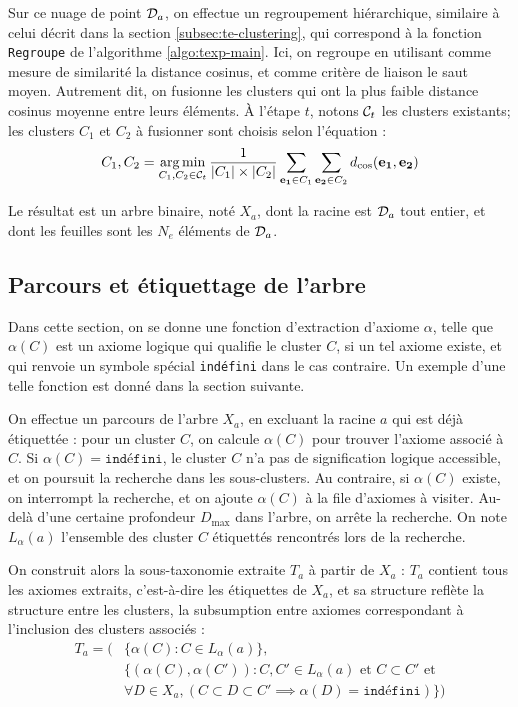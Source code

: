 Sur ce nuage de point $\cal{D}_a$, on effectue un regroupement hiérarchique, similaire à celui décrit dans la section \ref{subsec:te-clustering}, qui correspond à la fonction \texttt{Regroupe} de l'algorithme \ref{algo:texp-main}.
Ici, on regroupe en utilisant comme mesure de similarité la distance cosinus, et comme critère de liaison le saut moyen. Autrement dit, on fusionne les clusters qui ont la plus faible distance cosinus moyenne entre leurs éléments. À l'étape $t$, notons $\cal{C}_t$ les clusters existants; les clusters $C_1$ et $C_2$ à fusionner sont choisis selon l'équation :
\begin{equation}
    C_1, C_2 = \argmin_{C_1, C_2 \in \cal{C}_t} \frac{1}{|C_1| \times |C_2|} \sum_{\bf{e_1}\in C_1} \sum_{\bf{e_2} \in C_2} d_\text{cos}(\bf{e_1, e_2})
\end{equation}

Le résultat est un arbre binaire, noté $X_a$, dont la racine est $\cal{D}_a$ tout entier, et dont les feuilles sont les $N_e$ éléments de $\cal{D}_a$. 

\subsection{Parcours et étiquettage de l'arbre}

Dans cette section, on se donne une fonction d'extraction d'axiome $\alpha$, telle que $\alpha(C)$ est un axiome logique qui qualifie le cluster $C$, si un tel axiome existe, et qui renvoie un symbole spécial \texttt{indéfini} dans le cas contraire. Un exemple d'une telle fonction est donné dans la section suivante. 

On effectue un parcours de l'arbre $X_a$, en excluant la racine $a$ qui est déjà étiquettée : pour un cluster $C$, on calcule $\alpha(C)$ pour trouver l'axiome associé à $C$. Si $\alpha(C) = \texttt{indéfini}$, le cluster $C$ n'a pas de signification logique accessible, et on poursuit la recherche dans les sous-clusters. Au contraire, si $\alpha(C)$ existe, on interrompt la recherche, et on ajoute $\alpha(C)$ à la file d'axiomes à visiter. Au-delà d'une certaine profondeur $D_\text{max}$ dans l'arbre, on arrête la recherche. On note $L_\alpha(a)$ l'ensemble des cluster $C$ étiquettés rencontrés lors de la recherche.


On construit alors la sous-taxonomie extraite $T_a$ à partir de $X_a$ : $T_a$ contient tous les axiomes extraits, c'est-à-dire les étiquettes de $X_a$, et sa structure reflète la structure entre les clusters, la subsumption entre axiomes correspondant à l'inclusion des clusters associés :
\begin{align}
    T_a = (& \{ \alpha(C) : C \in L_\alpha(a) \}, \nonumber \\
        & \{ (\alpha(C), \alpha(C')) : C, C' \in L_\alpha(a) \textrm{ et } C \subset C' \textrm{ et} \nonumber  \\
    & \forall D \in X_a, (C \subset D \subset C' \implies \alpha(D) = \texttt{indéfini})\})
\end{align}

